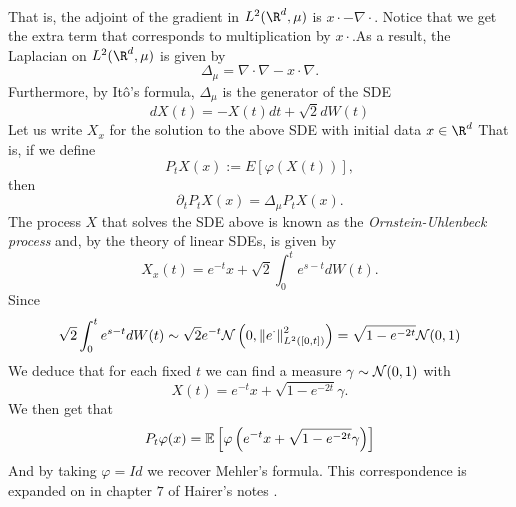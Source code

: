\documentclass[12pt]{article}
\begin{document}
\begin{CJK*}{UTF8}{gbsn}
\begin{align*}
	\end{align*}
	That is, the adjoint of the gradient in $L^2(\R^d,\mu )$ is $x\cdot -\nabla\cdot $. Notice that we get the extra term that corresponds to multiplication by $x\cdot $.As a result, the Laplacian on $L^2(\R^d, \mu )$ is given by
	\begin{equation*}
		\Delta_\mu =\nabla\cdot \nabla-x\cdot \nabla .
	\end{equation*}
	Furthermore, by Itô's formula, $\Delta_\mu $ is the generator of the SDE
	\begin{equation*}
		dX(t)=-X(t)d t+ \sqrt{2}dW(t)
	\end{equation*}
	Let us write $X_x$ for the solution to the above SDE with initial data  $x \in \R^d$
	That is, if we define $$P_tX(x):=E[\varphi(X(t))],$$ then
	\begin{equation*}
		\partial _tP_tX(x)=\Delta_\mu P_tX(x) .
	\end{equation*}
	The process $X$ that solves the SDE above is known as the \emph{Ornstein-Uhlenbeck process} and, by the theory of linear SDEs, is given by
	\begin{equation*}
		X_x(t)=e^{-t}x+\sqrt{2} \int_{0}^te^{s-t} dW(t).
	\end{equation*}
	Since
	\begin{equation*}
		\sqrt{2} \int_{0}^te^{s-t} dW(t)\sim \sqrt{2} e^{-t}\mathcal{N}\left(0,\norm{e^\cdot }^2_{L^2([0,t])}\right)=\sqrt{1-e^{-2t}}\mathcal{N}(0,1)
	\end{equation*}
	We deduce that for each fixed $t$ we can find a measure $\gamma   \sim \mathcal{N}(0,1)$ with
	\begin{equation*}
		X(t)=e^{-t}x+\sqrt{1-e^{-2t}}\gamma .
	\end{equation*}
	We then get that
	\begin{equation*}
		P_t \varphi(x)=\mathbb{E}\left[\varphi\left(e^{-t}x+\sqrt{1-e^{-2t}}\gamma  \right)\right]
	\end{equation*}
	And by taking $\varphi=Id$ we recover Mehler's formula. This correspondence is expanded on in chapter $7$ of Hairer's notes \cite{hairer2009introduction}.
\end{CJK*}




\end{document}
